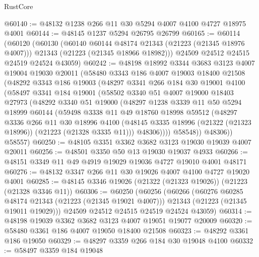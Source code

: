 \begin{lexlean}{RustCore}
\begin{coremodule}
@60140 := @48132 @1238 @266 @11 @30 @5294 @4007 @4100 @4727 @18975 @4001
@60144 := @48145 @1237 @5294 @26795 @26799
@60165 := @60114
    (@60120
      (@60130
        (@60140 @60144 @48174 @21343 (@21223 (@21345 @18976 @4007)))
        @21343
        (@21223 (@21345 @18966 @18982)))
      @24509
      @24512
      @24515
      @24519
      @24524
      @43059)
@60242 := @48198
    @18992
    @3344
    @3683
    @3123
    @4007
    @19004
    @19030
    @20011
    (@58480
      @3343
      @186
      @4007
      @19003
      @18400
      @21508
      (@48292
        @3343
        @186
        @19003
        (@48297
          @3341
          @266
          @184
          @30
          @19001
          @4100
          (@58497
            @3341
            @184
            @19001
            (@58502
              @3340
              @51
              @4007
              @19000
              @18403
              @27973
              (@48292
                @3340
                @51
                @19000
                (@48297
                  @1238
                  @3339
                  @11
                  @50
                  @5294
                  @18999
                  @60144
                  (@59498
                    @3338
                    @11
                    @49
                    @18760
                    @18998
                    @59512
                    (@48297
                      @3336
                      @266
                      @11
                      @30
                      @18996
                      @4100
                      (@48145 @3335 @18996 (@21322 (@21323 @18996)) (@21223 (@21328 @3335 @11)))
                      @48306))))
              @58548))
          @48306))
      @58557)
@60250 := @48105 @3351 @3362 @3682 @3123 @19030 @19039 @4007 @20011
@60256 := @48501 @3350 @50 @13 @19030 @19037 @4933
@60266 := @48151 @3349 @11 @49 @4919 @19029 @19036 @4727 @19010 @4001 @48171
@60276 := @48132 @3347 @266 @11 @30 @19026 @4007 @4100 @4727 @19020 @4001
@60285 := @48145 @3346 @19026 (@21322 (@21323 @19026)) (@21223 (@21328 @3346 @11))
@60306 := @60250
    (@60256
      (@60266
        (@60276 @60285 @48174 @21343 (@21223 (@21345 @19021 @4007)))
        @21343
        (@21223 (@21345 @19011 @19029)))
      @24509
      @24512
      @24515
      @24519
      @24524
      @43059)
@60314 := @48198 @19039 @3362 @3682 @3123 @4007 @19051 @19077 @20009
@60320 := @58480 @3361 @186 @4007 @19050 @18400 @21508
@60323 := @48292 @3361 @186 @19050
@60329 := @48297 @3359 @266 @184 @30 @19048 @4100
@60332 := @58497 @3359 @184 @19048

\end{coremodule}
\end{lexlean}
